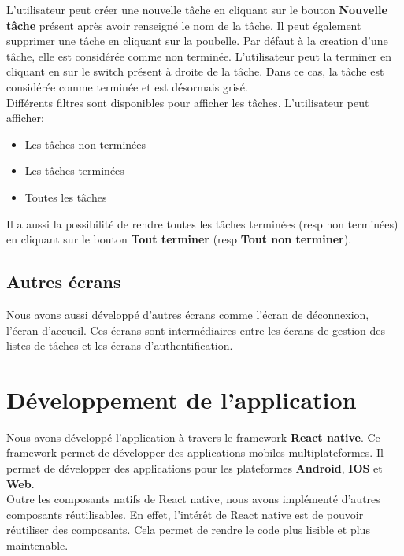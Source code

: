 \documentclass[12pt]{article}
\begin{document}
        L'utilisateur peut créer une nouvelle tâche en cliquant sur le bouton \textbf{Nouvelle tâche} présent
        après avoir renseigné le nom de la tâche. Il peut également supprimer une tâche en cliquant sur la poubelle.
        Par défaut à la creation d'une tâche, elle est considérée comme non terminée. L'utilisateur peut la terminer
        en cliquant en sur le switch présent à droite de la tâche. Dans ce cas, la tâche est considérée comme terminée
        et est désormais grisé.\\
        Différents filtres sont disponibles pour afficher les tâches. L'utilisateur peut afficher;
        \begin{itemize}
            \item Les tâches non terminées
            \item Les tâches terminées
            \item Toutes les tâches
        \end{itemize}
        Il a aussi la possibilité de rendre toutes les tâches terminées (resp non terminées) en cliquant sur le bouton
        \textbf{Tout terminer} (resp \textbf{Tout non terminer}).

        \subsection{Autres écrans}{\label{subsec:other}}
        Nous avons aussi développé d'autres écrans comme l'écran de déconnexion, l'écran d'accueil.
        Ces écrans sont intermédiaires entre les écrans de gestion des listes de tâches et les écrans d'authentification.

        \section{Développement de l'application}{\label{sec:dev}}
        Nous avons développé l'application à travers le framework \textbf{React native}. Ce framework permet de développer
        des applications mobiles multiplateformes. Il permet de développer des applications pour les plateformes
        \textbf{Android}, \textbf{IOS} et \textbf{Web}.\\
        Outre les composants natifs de React native, nous avons implémenté d'autres composants réutilisables. En effet,
        l'intérêt de React native est de pouvoir réutiliser des composants. Cela permet de rendre le code plus lisible
        et plus maintenable.\\
\end{document}
